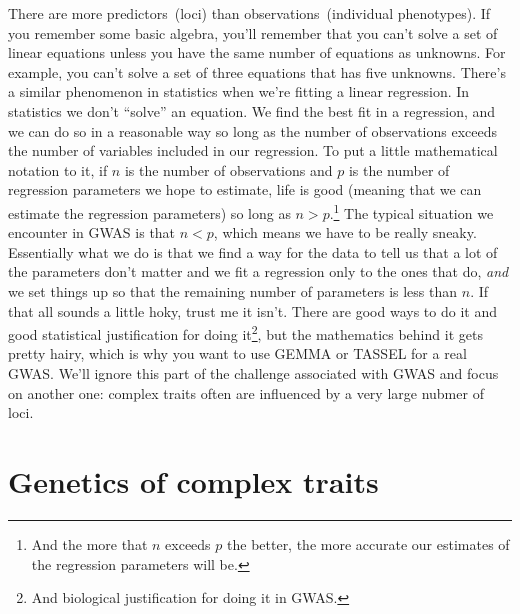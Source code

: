 \documentclass[12pt]{article}
\begin{document}
There are more predictors~(loci) than observations~(individual
phenotypes). If you remember some basic algebra, you'll remember that
you can't solve a set of linear equations unless you have the same
number of equations as unknowns. For example, you can't solve a set of
three equations that has five unknowns. There's a similar phenomenon
in statistics when we're fitting a linear regression. In statistics we
don't ``solve'' an equation. We find the best fit in a regression, and
we can do so in a reasonable way so long as the number of observations
exceeds the number of variables included in our regression. To put a
little mathematical notation to it, if $n$ is the number of
observations and $p$ is the number of regression parameters we hope to
estimate, life is good (meaning that we can estimate the regression
parameters) so long as $n > p$.\footnote{And the more that $n$ exceeds
  $p$ the better, the more accurate our estimates of the regression
  parameters will be.} The typical situation we encounter in GWAS is
that $n < p$, which means we have to be really sneaky. Essentially
what we do is that we find a way for the data to tell us that a lot of
the parameters don't matter and we fit a regression only to the ones
that do, {\it and\/} we set things up so that the remaining number of
parameters is less than $n$. If that all sounds a little hoky, trust
me it isn't. There are good ways to do it and good statistical
justification for doing it\footnote{And biological justification for
  doing it in GWAS.}, but the mathematics behind it gets pretty hairy,
which is why you want to use GEMMA or TASSEL for a real GWAS. We'll
ignore this part of the challenge associated with GWAS and focus on
another one: complex traits often are influenced by a very large
nubmer of loci.

\section*{Genetics of complex traits}
\end{document}
